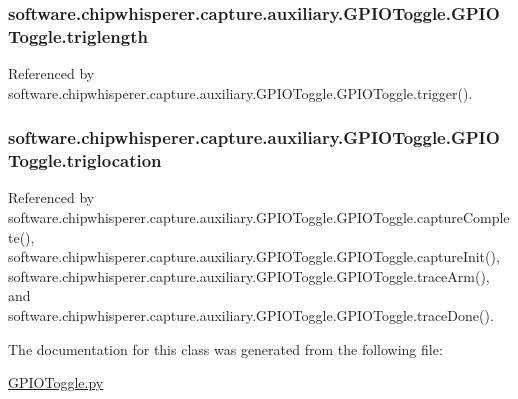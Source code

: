 \subsubsection[{triglength}]{\setlength{\rightskip}{0pt plus 5cm}software.\+chipwhisperer.\+capture.\+auxiliary.\+G\+P\+I\+O\+Toggle.\+G\+P\+I\+O\+Toggle.\+triglength}\label{classsoftware_1_1chipwhisperer_1_1capture_1_1auxiliary_1_1GPIOToggle_1_1GPIOToggle_a098d7e971c52505b9c4bfade15a3848d}


Referenced by software.\+chipwhisperer.\+capture.\+auxiliary.\+G\+P\+I\+O\+Toggle.\+G\+P\+I\+O\+Toggle.\+trigger().

\hypertarget{classsoftware_1_1chipwhisperer_1_1capture_1_1auxiliary_1_1GPIOToggle_1_1GPIOToggle_a123513b84fbc63e9e9effd97a5f1dfeb}{}
\subsubsection[{triglocation}]{\setlength{\rightskip}{0pt plus 5cm}software.\+chipwhisperer.\+capture.\+auxiliary.\+G\+P\+I\+O\+Toggle.\+G\+P\+I\+O\+Toggle.\+triglocation}\label{classsoftware_1_1chipwhisperer_1_1capture_1_1auxiliary_1_1GPIOToggle_1_1GPIOToggle_a123513b84fbc63e9e9effd97a5f1dfeb}


Referenced by software.\+chipwhisperer.\+capture.\+auxiliary.\+G\+P\+I\+O\+Toggle.\+G\+P\+I\+O\+Toggle.\+capture\+Complete(), software.\+chipwhisperer.\+capture.\+auxiliary.\+G\+P\+I\+O\+Toggle.\+G\+P\+I\+O\+Toggle.\+capture\+Init(), software.\+chipwhisperer.\+capture.\+auxiliary.\+G\+P\+I\+O\+Toggle.\+G\+P\+I\+O\+Toggle.\+trace\+Arm(), and software.\+chipwhisperer.\+capture.\+auxiliary.\+G\+P\+I\+O\+Toggle.\+G\+P\+I\+O\+Toggle.\+trace\+Done().



The documentation for this class was generated from the following file\+:\begin{DoxyCompactItemize}
\item 
\hyperlink{GPIOToggle_8py}{G\+P\+I\+O\+Toggle.\+py}\end{DoxyCompactItemize}

